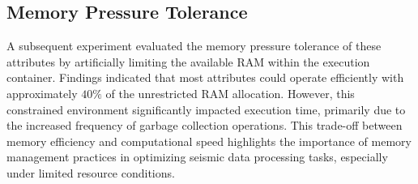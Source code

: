 \subsection{Memory Pressure Tolerance}


A subsequent experiment evaluated the memory pressure tolerance of these attributes by artificially limiting the available RAM within the execution container.
Findings indicated that most attributes could operate efficiently with approximately $40\%$ of the unrestricted RAM allocation.
However, this constrained environment significantly impacted execution time, primarily due to the increased frequency of garbage collection operations.
This trade-off between memory efficiency and computational speed highlights the importance of memory management practices in optimizing seismic data processing tasks, especially under limited resource conditions.
